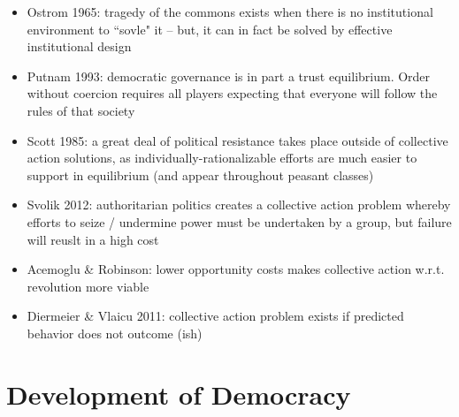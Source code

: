 \documentclass[12pt]{article}
\begin{document}
\begin{itemize}
    \begin{itemize}
        \item Also note -- ``exploitation of the great by the small'' -- largest stakeholders tend to contribute disproportionately as they have the most to lose by nonappropriation
    \end{itemize}
    \item Ostrom 1965: tragedy of the commons exists when there is no institutional environment to ``sovle" it -- but, it can in fact be solved by effective institutional design
    \item Putnam 1993: democratic governance is in part a trust equilibrium. Order without coercion requires all players expecting that everyone will follow the rules of that society
    \item Scott 1985: a great deal of political resistance takes place outside of collective action solutions, as individually-rationalizable efforts are much easier to support in equilibrium (and appear throughout peasant classes)
    \item Svolik 2012: authoritarian politics creates a collective action problem whereby efforts to seize / undermine power must be undertaken by a group, but failure will reuslt in a high cost
    \item Acemoglu \& Robinson: lower opportunity costs makes collective action w.r.t. revolution more viable
    \item Diermeier \& Vlaicu 2011: collective action problem exists if predicted behavior does not outcome (ish)
\end{itemize}




\section*{Development of Democracy}
\end{document}
